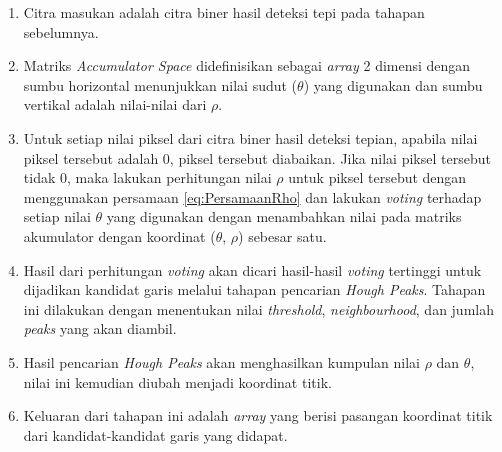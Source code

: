 \begin{enumerate}
	\item Citra masukan adalah citra biner hasil deteksi tepi pada tahapan sebelumnya.
	\item Matriks \textit{Accumulator Space} didefinisikan sebagai \textit{array} 2 dimensi dengan sumbu horizontal menunjukkan nilai sudut ($\theta$) yang digunakan dan sumbu vertikal adalah nilai-nilai dari $\rho$.\\
	\begin{adjustbox}{width=1\textwidth}
		\noindent
		\begin{minipage}{\linewidth}
			\centering{}
			\label{fig:MatriksAccumulatorSpace}
		\end{minipage}
	\end{adjustbox}
	\item Untuk setiap nilai piksel dari citra biner hasil deteksi tepian, apabila nilai piksel tersebut adalah 0, piksel tersebut diabaikan. Jika nilai piksel tersebut tidak 0, maka lakukan perhitungan nilai $\rho$ untuk piksel tersebut dengan menggunakan persamaan \ref{eq:PersamaanRho} dan lakukan \textit{voting} terhadap setiap nilai $\theta$ yang digunakan dengan menambahkan nilai pada matriks akumulator dengan koordinat ($\theta$, $\rho$) sebesar satu.
	\item Hasil dari perhitungan \textit{voting} akan dicari hasil-hasil \textit{voting} tertinggi untuk dijadikan kandidat garis melalui tahapan pencarian \textit{Hough Peaks}. Tahapan ini dilakukan dengan menentukan nilai \textit{threshold}, \textit{neighbourhood}, dan jumlah \textit{peaks} yang akan diambil.
	\item Hasil pencarian \textit{Hough Peaks} akan menghasilkan kumpulan nilai $\rho$ dan $\theta$, nilai ini kemudian diubah menjadi koordinat titik.
	\item Keluaran dari tahapan ini adalah \textit{array} yang berisi pasangan koordinat titik dari kandidat-kandidat garis yang didapat.\\
\end{enumerate}

